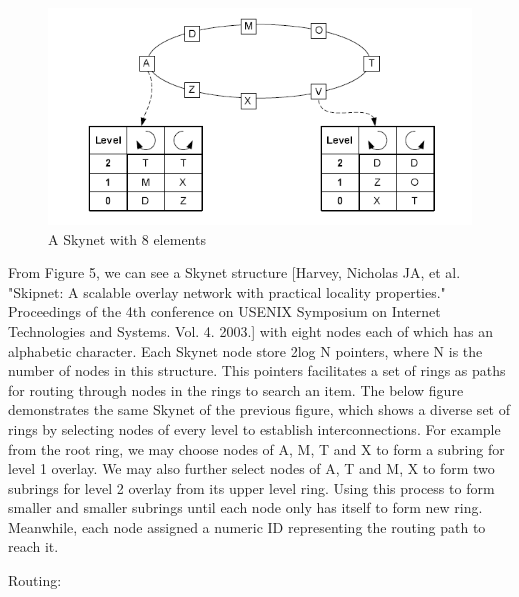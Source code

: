 \documentclass[oribibl]{llncs}
\begin{document}
\begin{figure}[here]
\center
\includegraphics[width=12cm]{images/skynet}
\caption{A Skynet with 8 elements}
\label{fig:jumplist}
\end{figure}

From Figure 5, we can see a Skynet structure [Harvey, Nicholas JA, et al. "Skipnet: A scalable overlay network with practical locality properties." Proceedings of the 4th conference on USENIX Symposium on Internet Technologies and Systems. Vol. 4. 2003.] with eight nodes each of which has an alphabetic character. Each Skynet node store 2log N pointers, where N is the number of nodes in this structure. This pointers facilitates a set of rings as paths for routing through nodes in the rings to search an item. The below figure demonstrates the same Skynet of the previous figure, which shows a diverse set of rings by selecting nodes of every level to establish interconnections. For example from the root ring, we may choose nodes of A, M, T and X to form a subring for level 1 overlay. We may also further select nodes of A, T and M, X to form two subrings for level 2 overlay from its upper level ring. Using this process to form smaller and smaller subrings until each node only has itself to form new ring. Meanwhile, each node assigned a numeric ID representing the routing path to reach it.

Routing:
\end{document}

